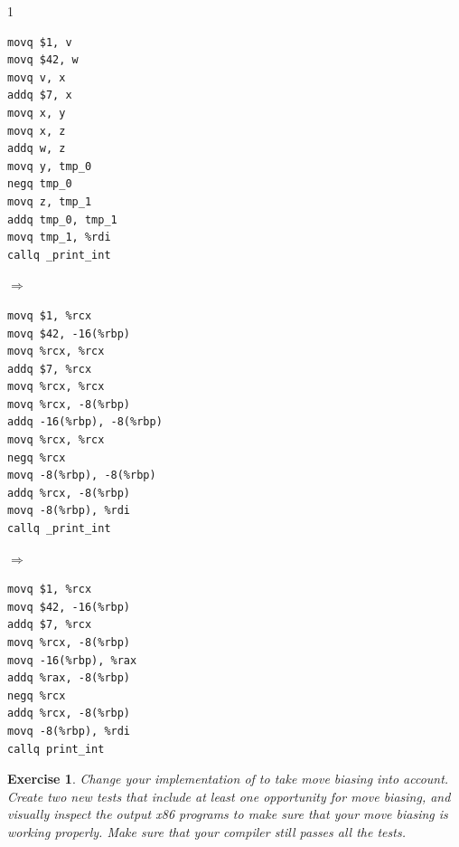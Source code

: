 \documentclass[7x10]{TimesAPriori_MIT}%
\def\pythonEd{1}
\providecommand{\BookEdition}{1}
\let\edition\BookEdition
\newcommand{\pythonColor}[0]{}
\newtheorem{exercise}[theorem]{Exercise}
\numberwithin{theorem}{chapter}
\numberwithin{definition}{chapter}
\numberwithin{equation}{chapter}
\begin{document}
{\if\edition\pythonEd\pythonColor
\begin{center}
\begin{minipage}{0.20\textwidth}
\begin{lstlisting}[basicstyle=\ttfamily\footnotesize]
movq $1, v
movq $42, w
movq v, x
addq $7, x
movq x, y
movq x, z
addq w, z
movq y, tmp_0
negq tmp_0
movq z, tmp_1
addq tmp_0, tmp_1
movq tmp_1, %rdi
callq _print_int
\end{lstlisting}
\end{minipage}
${\Rightarrow\qquad}$
\begin{minipage}{0.35\textwidth}
\begin{lstlisting}[basicstyle=\ttfamily\footnotesize]
movq $1, %rcx
movq $42, -16(%rbp)
movq %rcx, %rcx
addq $7, %rcx
movq %rcx, %rcx
movq %rcx, -8(%rbp)
addq -16(%rbp), -8(%rbp)
movq %rcx, %rcx
negq %rcx
movq -8(%rbp), -8(%rbp)
addq %rcx, -8(%rbp)
movq -8(%rbp), %rdi
callq _print_int
\end{lstlisting}
\end{minipage}
${\Rightarrow\qquad}$
\begin{minipage}{0.20\textwidth}
\begin{lstlisting}[basicstyle=\ttfamily\footnotesize]
movq $1, %rcx
movq $42, -16(%rbp)
addq $7, %rcx
movq %rcx, -8(%rbp)
movq -16(%rbp), %rax
addq %rax, -8(%rbp)
negq %rcx
addq %rcx, -8(%rbp)
movq -8(%rbp), %rdi
callq print_int
\end{lstlisting}
\end{minipage}
\end{center}
\fi}

\begin{exercise}\normalfont\normalsize
Change your implementation of  to take move
biasing into account. Create two new tests that include at least one
opportunity for move biasing, and visually inspect the output x86
programs to make sure that your move biasing is working properly. Make
sure that your compiler still passes all the tests.
\end{exercise}


\end{document}
